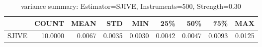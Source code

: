 \begin{table}[ht]
\centering
\caption{variance summary: Estimator=SJIVE, Instruments=500, Strength=0.30}
\begin{tabular}{lrrrrrrrr}
\toprule
 & COUNT & MEAN & STD & MIN & 25\% & 50\% & 75\% & MAX \\
\midrule
SJIVE & 10.0000 & 0.0067 & 0.0035 & 0.0030 & 0.0042 & 0.0047 & 0.0093 & 0.0125 \\
\bottomrule
\end{tabular}
\end{table}
